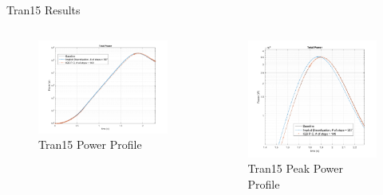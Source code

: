 \documentclass[8pt,xcolor=dvipnames]{beamer}
\begin{document}
\begin{frame}{Tran15 Results}

\begin{columns}

\begin{figure}
\caption{Tran15 Power Profile}
\includegraphics[width=\linewidth]{figures/Tran15_DT2.png}
\end{figure}

\begin{figure}
\caption{Tran15 Peak Power Profile}
\includegraphics[width=\linewidth]{figures/Tran15_DT2_peak.png}
\end{figure}

\end{columns}

\end{frame}
\end{document}

